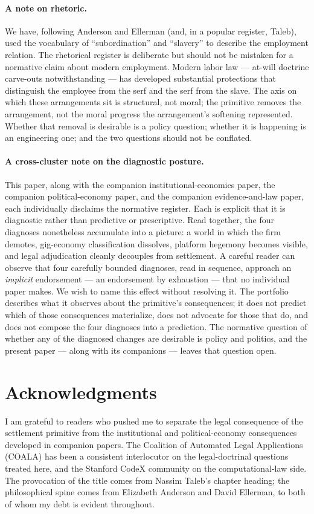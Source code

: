 \documentclass[11pt,a4paper]{article}
\theoremstyle{remark}
\begin{document}
\paragraph{A note on rhetoric.}
We have, following Anderson and Ellerman (and, in a popular
register, Taleb), used the vocabulary of ``subordination'' and
``slavery'' to describe the employment relation. The rhetorical
register is deliberate but should not be mistaken for a normative
claim about modern employment. Modern labor law --- at-will
doctrine carve-outs notwithstanding --- has developed substantial
protections that distinguish the employee from the serf and the
serf from the slave. The axis on which these arrangements sit is
structural, not moral; the primitive removes the arrangement, not
the moral progress the arrangement's softening represented.
Whether that removal is desirable is a policy question; whether
it is happening is an engineering one; and the two questions
should not be conflated.

\paragraph{A cross-cluster note on the diagnostic posture.}
This paper, along with the companion institutional-economics
paper, the companion political-economy paper, and the companion
evidence-and-law paper, each individually disclaims
the normative register. Each is explicit that it is diagnostic
rather than predictive or prescriptive. Read together, the four
diagnoses nonetheless accumulate into a picture: a world in which
the firm demotes, gig-economy classification dissolves, platform
hegemony becomes visible, and legal adjudication cleanly decouples
from settlement. A careful reader can observe that four carefully
bounded diagnoses, read in sequence, approach an \emph{implicit}
endorsement --- an endorsement by exhaustion --- that no
individual paper makes. We wish to name this effect without
resolving it. The portfolio describes what it observes about the
primitive's consequences; it does not predict which of those
consequences materialize, does not advocate for those that do, and
does not compose the four diagnoses into a prediction. The
normative question of whether any of the diagnosed changes are
desirable is policy and politics, and the present paper --- along
with its companions --- leaves that question open.

\section*{Acknowledgments}
I am grateful to readers who pushed me to separate the legal
consequence of the settlement primitive from the institutional and
political-economy consequences developed in companion papers. The
Coalition of Automated Legal Applications (COALA) has been a
consistent interlocutor on the legal-doctrinal questions treated
here, and the Stanford CodeX community on the computational-law
side. The provocation of the title comes from Nassim Taleb's
chapter heading; the philosophical spine comes from Elizabeth
Anderson and David Ellerman, to both of whom my debt is evident
throughout.
\end{document}
